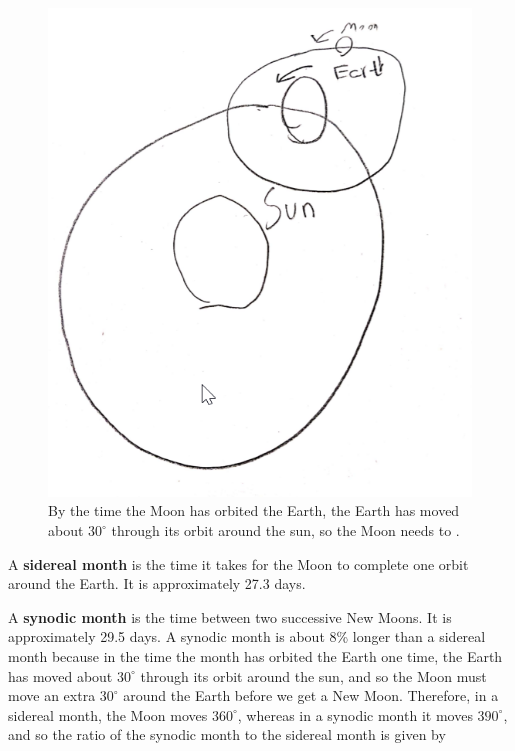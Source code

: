 \documentclass{templates/homework}
\begin{document}
\exercisepart
\begin{figure}[t]
    \includegraphics[]{diagrams/figure4.png}
    \caption{By the time the Moon has orbited the Earth,
    the Earth has moved about $30^\circ$ through its orbit around the sun,
    so the Moon needs to .}
    \label{fig:4}
\end{figure}
A \textbf{sidereal month} is the time it takes for the Moon to complete
one orbit around the Earth. It is approximately 27.3 days.

A \textbf{synodic month} is the time between two successive New Moons. It is
approximately 29.5 days. A synodic month is about 8\% longer than a sidereal month
because in the time the month has orbited the Earth one time, the Earth has moved about $30^\circ$ through its
orbit around the sun, and so the Moon must move an extra $30^\circ$ around the Earth before
we get a New Moon. Therefore, in a sidereal month, the Moon moves $360^\circ$, whereas in a synodic month
it moves $390^\circ$, and so the ratio of the synodic month to the sidereal month is given by
\end{document}
